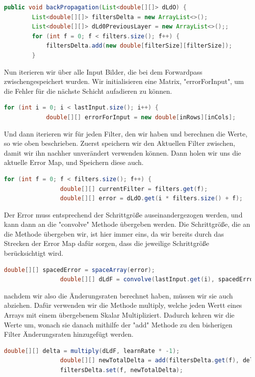 \documentclass[12pt]{article}
\begin{document}
\begin{lstlisting}[language=Java]
public void backPropagation(List<double[][]> dLdO) {
        List<double[][]> filtersDelta = new ArrayList<>();
        List<double[][]> dLd0PreviousLayer = new ArrayList<>();;
        for (int f = 0; f < filters.size(); f++) {
            filtersDelta.add(new double[filterSize][filterSize]);
        }
\end{lstlisting}
Nun iterieren wir über alle Input Bilder, die bei dem Forwardpass zwischengespeichert wurden. Wir initialisieren eine Matrix, "errorForInput", um die Fehler für die nächste Schicht aufadieren zu können.
\begin{lstlisting}[language=Java]
        for (int i = 0; i < lastInput.size(); i++) {
            double[][] errorForInput = new double[inRows][inCols];
\end{lstlisting}
Und dann iterieren wir für jeden Filter, den wir haben und berechnen die Werte, so wie oben beschrieben.
Zuerst speichern wir den Aktuellen Filter zwischen, damit wir ihn nachher unverändert verwenden können. Dann holen wir uns die aktuelle Error Map, und Speichern diese auch.
\begin{lstlisting}[language=Java]
            for (int f = 0; f < filters.size(); f++) {
                double[][] currentFilter = filters.get(f);
                double[][] error = dLdO.get(i * filters.size() + f);
\end{lstlisting}
Der Error muss entsprechend der Schrittgröße auseinandergezogen werden, und kann dann an die "convolve" Methode übergeben werden. Die Schrittgröße, die an die Methode übergeben wir, ist hier immer eins, da wir bereits durch das Strecken der Error Map dafür sorgen, dass die jeweilige Schrittgröße berücksichtigt wird.
\begin{lstlisting}[language=Java]
                double[][] spacedError = spaceArray(error);
                double[][] dLdF = convolve(lastInput.get(i), spacedError, 1);
\end{lstlisting}
nachdem wir also die Änderungsraten berechnet haben, müssen wir sie auch abziehen. Dafür verwenden wir die Methode multiply, welche jeden Wertt eines Arrays mit einem übergebenem Skalar Multipliziert. Dadurch kehren wir die Werte um, wonach sie danach mithilfe der "add" Methode zu den bisherigen Filter Änderungsraten hinzugefügt werden.
\begin{lstlisting}[language=Java]
                double[][] delta = multiply(dLdF, learnRate * -1);
                double[][] newTotalDelta = add(filtersDelta.get(f), delta);
                filtersDelta.set(f, newTotalDelta);
\end{lstlisting}
\end{document}
